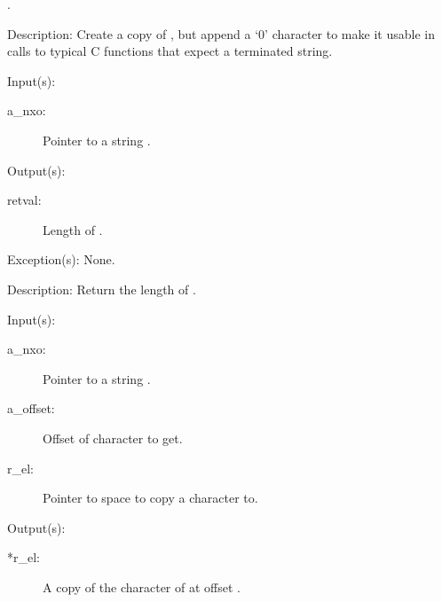 \begin{capi}
\begin{capilist}
\begin{description}
		\item[.]
		\end{description}
	\item[Description: ]
		Create a copy of , but append a `{\bs}0' character
		to make it usable in calls to typical C functions that expect a
		terminated string.
	\end{capilist}
\label{nxo_string_len_get}
	\begin{capilist}
	\item[Input(s): ]
		\begin{description}\item[]
		\item[a\_nxo: ]
			Pointer to a string .
		\end{description}
	\item[Output(s): ]
		\begin{description}\item[]
		\item[retval: ]
			Length of .
		\end{description}
	\item[Exception(s): ] None.
	\item[Description: ]
		Return the length of .
	\end{capilist}
\label{nxo_string_el_get}
	\begin{capilist}
	\item[Input(s): ]
		\begin{description}\item[]
		\item[a\_nxo: ]
			Pointer to a string \classname{nxo}.
		\item[a\_offset: ]
			Offset of character to get.
		\item[r\_el: ]
			Pointer to space to copy a character to.
		\end{description}
	\item[Output(s): ]
		\begin{description}\item[]
		\item[*r\_el: ]
			A copy of the character of  at offset
			\cvar{a\_offset}.
		\end{description}

\end{capilist}
\end{capi}
